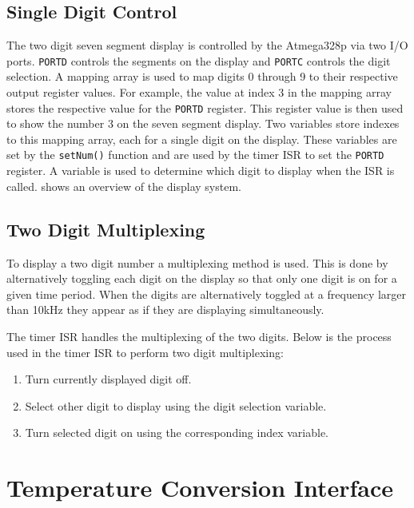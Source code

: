 \documentclass[main.tex]{subfiles}
\begin{document}
		\subsection{Single Digit Control}

		The two digit seven segment display is controlled by the Atmega328p via two
		I/O ports. \lstinline{PORTD} controls the segments on the display and
		\lstinline{PORTC} controls the digit selection. A mapping array is used to
		map digits 0 through 9 to their respective output register values. For
		example, the value at index 3 in the mapping array stores the respective
		value for the \lstinline{PORTD} register. This register value is then used
		to show the number 3 on the seven segment display. Two variables store
		indexes to this mapping array, each for a single digit on the display. These
		variables are set by the \lstinline{setNum()} function and are used by the
		timer ISR to set the \lstinline{PORTD} register. A variable is used to
		determine which digit to display when the ISR is called.
		 shows an overview of the display system.

		\subsection{Two Digit Multiplexing}
		To display a two digit number a multiplexing method is used. This is done by
		alternatively toggling each digit on the display so that only one digit is
		on for a given time period. When the digits are alternatively toggled at a
		frequency larger than 10kHz they appear as if they are displaying
		simultaneously. 

		The timer ISR handles the multiplexing of the two digits. Below is the
		process used in the timer ISR to perform two digit multiplexing: 

		\begin{enumerate}
			\item Turn currently displayed digit off.
			\item Select other digit to display using the digit selection variable.
			\item Turn selected digit on using the corresponding index variable.
		\end{enumerate}

	\section{Temperature Conversion Interface}\label{sec:tempConvIfcSec}
\end{document}
